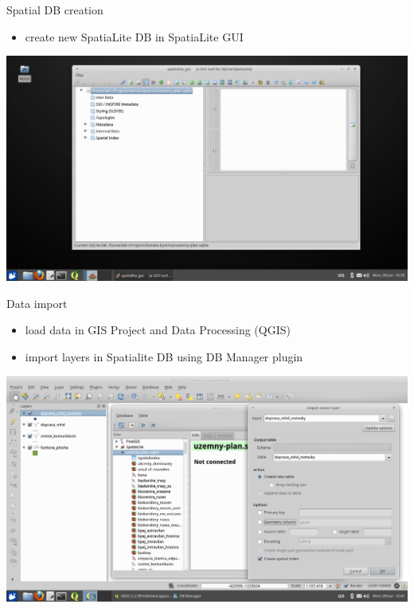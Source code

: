 \documentclass[12pt]{beamer}
\begin{document}
\begin{frame}{Spatial DB creation}
	\begin{itemize}
		\item create new SpatiaLite DB in SpatiaLite GUI
	\end{itemize}
	\begin{center}
		\includegraphics[keepaspectratio=true,height=0.7\textheight]{images/real-world-example/project-create-db.png}
	\end{center}
\end{frame}


\begin{frame}{Data import}
	\begin{itemize}
		\item load data in GIS Project and Data Processing (QGIS)
		\item import layers in Spatialite DB using DB Manager plugin
	\end{itemize}
	\begin{center}
		\includegraphics[keepaspectratio=true,height=0.6\textheight]{images/real-world-example/project-db-import-layers.png}
	\end{center}
\end{frame}
\end{document}
